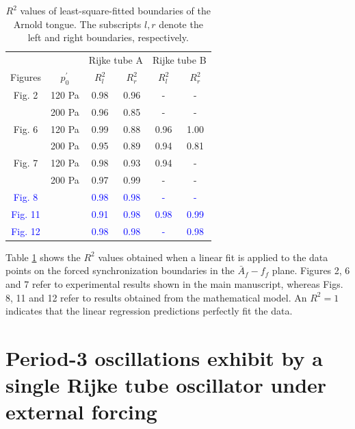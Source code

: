 \documentclass[%
 aps,
 amsmath,amssymb,
preprint,%
superscriptaddress,
]{revtex4-2}
\begin{document}
\begin{table}[h]
\caption{\label{tab:table1} $R^2$ values of least-square-fitted boundaries of the Arnold tongue. The subscripts $l,r$ denote the left and right boundaries, respectively.}
\begin{ruledtabular}
\begin{tabular}{cccccc}
 & & \multicolumn{2}{c}{Rijke tube A}&\multicolumn{2}{c}{Rijke tube B}\\
 Figures & $p^\prime_{0}$ & $R^2_l$ & $R^2_r$ & $R^2_l$ & $R^2_r$ \\ \hline
 Fig. 2 & 120 Pa & 0.98 & 0.96 & - & - \\
        & 200 Pa & 0.96 & 0.85 & - & - \\
 Fig. 6 & 120 Pa & 0.99 & 0.88 & 0.96 & 1.00 \\
        & 200 Pa & 0.95 & 0.89 & 0.94 & 0.81 \\
 Fig. 7 & 120 Pa & 0.98 & 0.93 & 0.94 &  -   \\
        & 200 Pa & 0.97 & 0.99 &   -  &  -   \\
     \textcolor{blue}{Fig. 8} &        & \textcolor{blue}{0.98} & \textcolor{blue}{0.98} &  \textcolor{blue}{-} & \textcolor{blue}{-} \\
 \textcolor{blue}{Fig. 11} &       & \textcolor{blue}{0.91} & \textcolor{blue}{0.98} & \textcolor{blue}{0.98} & \textcolor{blue}{0.99} \\
 \textcolor{blue}{Fig. 12} &       & \textcolor{blue}{0.98} & \textcolor{blue}{0.98} & \textcolor{blue}{-} & \textcolor{blue}{0.98} \\
\end{tabular}
\end{ruledtabular}
\end{table}

Table \ref{tab:table1} shows the $R^2$ values obtained when a linear fit is applied to the data points on the forced synchronization boundaries in the $\bar{A}_f-f_f$ plane. Figures 2, 6 and 7 refer to experimental results shown in the main manuscript, whereas Figs. 8, 11 and 12 refer to results obtained from the mathematical model. An $R^2 = 1$ indicates that the linear regression predictions perfectly fit the data. 

\newpage

\section{Period-3 oscillations exhibit by a single Rijke tube oscillator under external forcing}
\label{Period_3}
\end{document}

